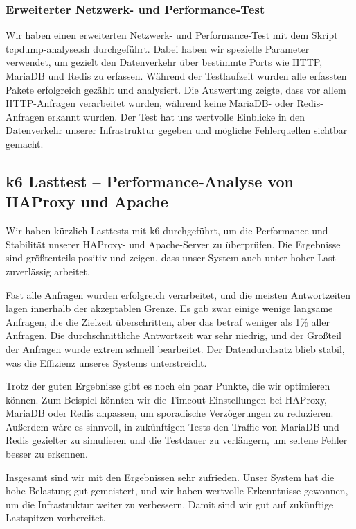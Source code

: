  
\subsubsection{Erweiterter Netzwerk- und Performance-Test}
Wir haben einen erweiterten Netzwerk- und Performance-Test mit dem Skript tcpdump-analyse.sh durchgeführt. Dabei haben wir spezielle Parameter verwendet, um gezielt den Datenverkehr über bestimmte Ports wie HTTP, MariaDB und Redis zu erfassen. Während der Testlaufzeit wurden alle erfassten Pakete erfolgreich gezählt und analysiert. Die Auswertung zeigte, dass vor allem HTTP-Anfragen verarbeitet wurden, während keine MariaDB- oder Redis-Anfragen erkannt wurden. Der Test hat uns wertvolle Einblicke in den Datenverkehr unserer Infrastruktur gegeben und mögliche Fehlerquellen sichtbar gemacht.



\subsection{k6 Lasttest – Performance-Analyse von HAProxy und Apache}
Wir haben kürzlich Lasttests mit k6 durchgeführt, um die Performance und Stabilität unserer HAProxy- und Apache-Server zu überprüfen. Die Ergebnisse sind größtenteils positiv und zeigen, dass unser System auch unter hoher Last zuverlässig arbeitet.

Fast alle Anfragen wurden erfolgreich verarbeitet, und die meisten Antwortzeiten lagen innerhalb der akzeptablen Grenze. Es gab zwar einige wenige langsame Anfragen, die die Zielzeit überschritten, aber das betraf weniger als 1\% aller Anfragen. Die durchschnittliche Antwortzeit war sehr niedrig, und der Großteil der Anfragen wurde extrem schnell bearbeitet. Der Datendurchsatz blieb stabil, was die Effizienz unseres Systems unterstreicht.

Trotz der guten Ergebnisse gibt es noch ein paar Punkte, die wir optimieren können. Zum Beispiel könnten wir die Timeout-Einstellungen bei HAProxy, MariaDB oder Redis anpassen, um sporadische Verzögerungen zu reduzieren. Außerdem wäre es sinnvoll, in zukünftigen Tests den Traffic von MariaDB und Redis gezielter zu simulieren und die Testdauer zu verlängern, um seltene Fehler besser zu erkennen.

Insgesamt sind wir mit den Ergebnissen sehr zufrieden. Unser System hat die hohe Belastung gut gemeistert, und wir haben wertvolle Erkenntnisse gewonnen, um die Infrastruktur weiter zu verbessern. Damit sind wir gut auf zukünftige Lastspitzen vorbereitet.

